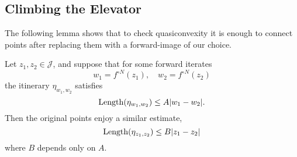 \iffalse
\begin{proof}
Let
\begin{align*}
\CriticalOrbit(f)=\{f^n(0): n \in \mathbb N\}
\end{align*} be the forward orbit of the critical point.
As long as the distance $|z_1-z_2|$ is small in comparison to the distances of $z_1,z_2$ from $\CriticalOrbit(f)$, we profit from applying $f$: By standard distortion estimates, 
\begin{align*}
|f(z_1)-f(z_2)|\geq c |z_1-z_2|
\end{align*}
for some constant $c>1$.

Indeed, in this case there is an annulus of definite modulus that has both $z_1,z_2$ in its bounded complementary component and has all points of $\CriticalOrbit(f)$ in the unbounded complementary component.

Instead of keeping track of the distance to $\mathrm{CriticalOrbit}(f)$, it is enough to consider the distance to the fixed point $1/2$, which is its only accumulation point on $\mathcal J$.

Thus by repeatedly applying $f$ we either manage to separate $z_1,z_2$ a definite distance apart, in which case the argument for the hyperbolic case works, or we manage to make (WLOG) 
\begin{align*}
\big|f^{\circ m} (z_1)-\tfrac 12\big| \leq c |f^{\circ m} (z_1)-f^{\circ m} (z_2)|
\end{align*}
for a constant $c$.
\end{proof}
\fi

\subsection{Climbing the Elevator}

The following lemma shows that to check quasiconvexity it is enough to connect points after replacing them with a forward-image of our choice.

\begin{lemma} \label{lem1}
Let $z_1,z_2 \in \mathcal J$, and suppose that for some forward iterates 
$$w_1=f^{\circ N }(z_1),\quad w_2=f^{\circ N }(z_2)$$
the itinerary $\eta_{w_1,w_2}$ satisfies 
\begin{equation*}
	\operatorname{Length}(\eta_{w_1,w_2}) \leq A |w_1-w_2|.
\end{equation*}
Then the original points enjoy a similar estimate,
\begin{equation*}
	\operatorname{Length}(\eta_{z_1,z_2}) \leq B |z_1-z_2|
\end{equation*}
where $B$ depends only on $A$.
\end{lemma}

